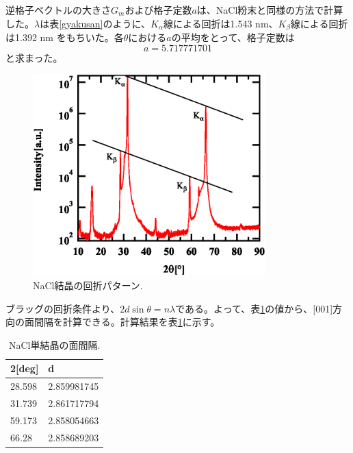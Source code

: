 \documentclass[11pt,a4j,uplatex]{jsarticle}
\begin{document}
逆格子ベクトルの大きさ$G_m$および格子定数$a$は、NaCl粉末と同様の方法で計算した。$\lambda$は表\ref{gyakusan}のように、$K_\alpha$線による回折は1.543 nm、$K_\beta$線による回折は1.392 nm をもちいた。各$\theta$における$a$の平均をとって、格子定数は
\begin{equation}
 \nonumber
 a=5.717771701
 \label{complete2}
\end{equation}
と求まった。
 \begin{figure}[htb]
  \centering
  \includegraphics[clip,width=9cm]{kakb.eps}
  \caption{NaCl結晶の回折パターン.}
  \label{kakb}
 \end{figure}
\fi

\newpage

 ブラッグの回折条件より、$2d\sin\theta=n\lambda$である。よって、表\ref{kakb}の値から、[001]方向の面間隔を計算できる。計算結果を表\ref{d}に示す。%

 \begin{table}[htbp]
  \begin{center}
   \caption{NaCl単結晶の面間隔.}
   \begin{tabular}{|l|l|}  \hline
    2[deg] & d           \\  \hline  \hline
    28.598 & 2.859981745 \\
    31.739 & 2.861717794 \\
    59.173 & 2.858054663 \\
    66.28  & 2.858689203 \\ \hline
   \end{tabular}
   \label{d}
  \end{center}
 \end{table}
\end{document}
